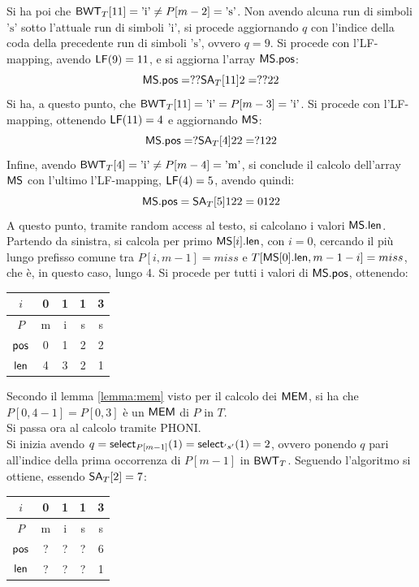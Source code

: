\begin{esempio}
  Si ha poi che $\mbox{\rm {\sf BWT}}_T[11]=\mbox{'i'}\neq P[m-2]=\mbox{'s'}$. Non avendo alcuna
  run di simboli $\mbox{'s'}$ sotto l'attuale run di simboli $\mbox{'i'}$, si
  procede aggiornando $q$ con l'indice della coda della precedente run di
  simboli $\mbox{'s'}$, ovvero $q=9$. Si procede con
  l'LF-mapping, avendo $\mbox{\rm {\sf LF}}(9)=11$, e si aggiorna l'array $\mbox{\rm {\sf MS}}.\mbox{\rm {\sf pos}}$:
  \[\mbox{\rm {\sf MS}}.\mbox{\rm {\sf pos}} = ??\mbox{\rm {\sf SA}}_T[11]2=??22\]
  Si ha, a questo punto, che $\mbox{\rm {\sf BWT}}_T[11]=\mbox{'i'}= P[m-3]=\mbox{'i'}$. Si
  procede con l'LF-mapping, ottenendo $\mbox{\rm {\sf LF}}(11)=4$ e aggiornando $\mbox{\rm {\sf MS}}$:
  \[\mbox{\rm {\sf MS}}.\mbox{\rm {\sf pos}} = ?\mbox{\rm {\sf SA}}_T[4]22=?122\]
  Infine, avendo $\mbox{\rm {\sf BWT}}_T[4]=\mbox{'i'}\neq P[m-4]=\mbox{'m'}$, si conclude il
  calcolo dell'array $\mbox{\rm {\sf MS}}$ con l'ultimo l'LF-mapping, $\mbox{\rm {\sf LF}}(4)=5$,
  avendo quindi:
  \[\mbox{\rm {\sf MS}}.\mbox{\rm {\sf pos}} = \mbox{\rm {\sf SA}}_T[5]122=0122\]
  A questo punto, tramite random access al testo, si calcolano i valori
  $\mbox{\rm {\sf MS}}.\mbox{\rm {\sf len}}$. Partendo da sinistra, si calcola per primo $\mbox{\rm {\sf MS}}[i].\mbox{\rm {\sf len}}$, con
  $i=0$, 
  cercando il più lungo prefisso comune tra $P[i,m-1]=miss$ e $T[\mbox{\rm {\sf MS}}[0].\mbox{\rm {\sf len}},
  m-1-i]=miss$, che è, in questo caso, lungo 4. Si procede per tutti i valori di
  $\mbox{\rm {\sf MS}}.\mbox{\rm {\sf pos}}$, ottenendo:
  \begin{table}[H]
    \centering
    \begin{tabular}{c||c|c|c|c}
      $i$ & 0 & 1 & 1 & 3 \\
      \hline
      $P$ & m & i & s & s \\
      \hline
      \hline
      $\mbox{\rm {\sf pos}}$ & 0 & 1 & 2 & 2\\
      \hline
      $\mbox{\rm {\sf len}}$ & 4 & 3 & 2 & 1\\
    \end{tabular}
  \end{table}
  \noindent
  Secondo il lemma \ref{lemma:mem} visto per il calcolo dei $\mbox{\rm {\sf MEM}}$, si ha che
  $P[0,4-1]=P[0,3]$ è un $\mbox{\rm {\sf MEM}}$ di $P$ in $T$.\\
  Si passa ora al calcolo tramite PHONI.\\
  Si inizia avendo $q=\mbox{\rm {\sf select}}_{P[m-1]}(1)=\mbox{\rm {\sf select}}_{'s'}(1)=2$, ovvero ponendo $q$
  pari all'indice della prima occorrenza di $P[m-1]$ in $\mbox{\rm {\sf BWT}}_T$. Seguendo
  l'algoritmo si ottiene, essendo $\mbox{\rm {\sf SA}}_T[2]=7$:
  \begin{table}[H]
    \centering
    \begin{tabular}{c||c|c|c|c}
      $i$ & 0 & 1 & 1 & 3 \\
      \hline
      $P$ & m & i & s & s \\
      \hline
      \hline
      $\mbox{\rm {\sf pos}}$ & ? & ? & ? & 6\\
      \hline
      $\mbox{\rm {\sf len}}$ & ? & ? & ? & 1\\

\end{tabular}
\end{table}
\end{esempio}
